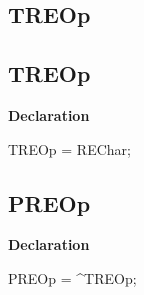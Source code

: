 \documentclass{report}
\newif\ifpdf
\begin{document}
\subsection*{\large{\textbf{TREOp}}\normalsize\hspace{1ex}\hrulefill}
\else
\subsection*{TREOp}
\fi
\label{RegExpr-TREOp}
\begin{list}{}{
\setlength{\itemindent}{0cm}
\setlength{\listparindent}{0cm}
\setlength{\leftmargin}{\evensidemargin}
\addtolength{\leftmargin}{\tmplength}
\settowidth{\labelsep}{X}
\addtolength{\leftmargin}{\labelsep}
\setlength{\labelwidth}{\tmplength}
}
\item[\textbf{Declaration}\hfill]
\ifpdf
\begin{flushleft}
\fi
\begin{ttfamily}
TREOp = REChar;\end{ttfamily}

\ifpdf
\end{flushleft}
\fi

\end{list}
\ifpdf
\subsection*{\large{\textbf{PREOp}}\normalsize\hspace{1ex}\hrulefill}
\else
\subsection*{PREOp}
\fi
\label{RegExpr-PREOp}
\begin{list}{}{
\setlength{\itemindent}{0cm}
\setlength{\listparindent}{0cm}
\setlength{\leftmargin}{\evensidemargin}
\addtolength{\leftmargin}{\tmplength}
\settowidth{\labelsep}{X}
\addtolength{\leftmargin}{\labelsep}
\setlength{\labelwidth}{\tmplength}
}
\item[\textbf{Declaration}\hfill]
\ifpdf
\begin{flushleft}
\fi
\begin{ttfamily}
PREOp = {\^{}}TREOp;\end{ttfamily}

\ifpdf
\end{flushleft}
\fi

\end{list}
\ifpdf
\end{document}
